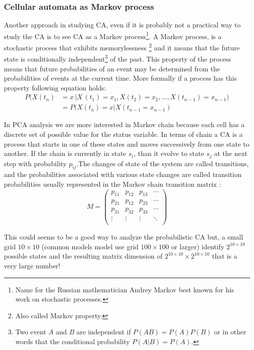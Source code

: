 \subsubsection{Cellular automata as Markov process}
Another approach in studying CA, even if it is probably not a practical
way to study the CA is to see CA as a Markov process\footnote{Name for the
Russian mathematician Andrey Markov best known for his work on stochastic
processes.}. A Markov process, is a stochastic process that exhibits
memorylessness \footnote{Also called Markov property.} and it means that the
future state is conditionally independent\footnote{Two event
$A$ and $B$ are independent if
$P(A B)=P(A)P(B)$ or in other words that the conditional
probability $P(A|B)=P(A)$.} of the past.
This property of the process means that future probabilities of an event may be
determined from the probabilities of events at the current time.
More formally if a process has this property following  equation holds:
\begin{align*}
P(X(t_n)&= x \,| X\,(t_1) = x_1,X(t_2) = x_2, \ldots,X(t_{n-1})=x_{n-1}) \\
&= P(X(t_n)=x | X(t_{n-1}=x_{n-1})
\end{align*}

In PCA analysis we are more interested in Markov chain because each cell has a
discrete set of possible value for the status variable.
In terms of chain a CA is a process that starts in one of these states and moves
successively from one state to another. If the chain is currently in state
$s_i$, than it evolve to state $s_j$ at
the next step with probability $p_{ij}$.The changes of state
of the system are called transitions, and the probabilities associated with
various state changes are called transition probabilities usually represented
in the Markov chain transition matrix :
\[
M =
\left( {\begin{array}{cccc}
p_{11} & p_{12} & p_{13} &\cdots \\
p_{21} & p_{12} & p_{23} &\cdots \\
p_{31} & p_{32} & p_{33} &\cdots \\
\vdots & \vdots  &\vdots& \ddots\\
\end{array} } \right)
\]

This could seems to be a good way to analyze the probabilistic CA but, a
small grid  $10\times10$ (common models model use grid
$100\times100$ or larger) identify
$2^{10\times10}$possible states and the resulting matrix
dimension of $2^{10\times10}\times2^{10\times10}$ that is a
very large number!


